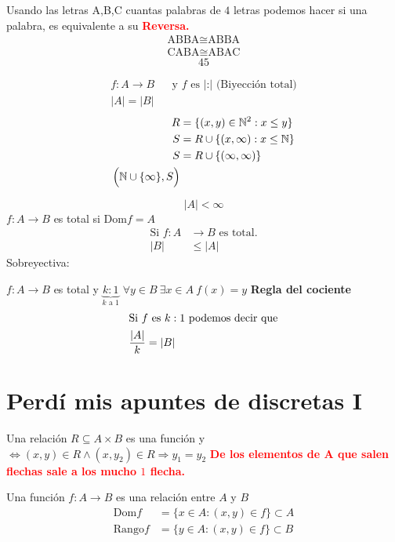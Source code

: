 \documentclass[12pt, twoside]{article}
\begin{document}
Usando las letras A,B,C cuantas palabras de $4$ letras podemos hacer si una palabra,
es equivalente a su \textcolor{red}{ \textbf{Reversa.}}
\begin{align*}
	\text{ABBA} \cong \text{ABBA}\\
	\text{CABA} \cong \text{ABAC}
\end{align*}
{\Huge\[45\]}

\teorema
{
	\Huge
	\begin{align*}
		f:A\longrightarrow B &&\text{y $f$ es |:| (Biyección total)}\\
		|A| = |B|
	\end{align*}
}
\begin{align*}
	R &= \{(x,y)\in\mathbb{N}^2:x\leq y\}\\
	S &= R \cup\{(x,\infty):x\leq\mathbb{N}\}\\
	S &= R \cup\{(\infty,\infty)\}\\
	\Big{(}
	\mathbb{N} \cup \{\infty\},S
	\Big{)}
\end{align*}

\[|A| < \infty\]
$f:A\longrightarrow B$ es total si Dom$f=A$
\begin{align*}
	\text{Si } f:A&\longrightarrow B \text{ es total.}\\
	|B| &\leq |A|
\end{align*}
Sobreyectiva:

$f:A\longrightarrow B$ es total y $\underbrace{k:1}_{\text{$k$ a $1$}}$
$\forall y \in B\ \exists x \in A\ f(x)=y$
\teorema
\textbf{Regla del cociente}
\begin{align*}
	\intertext{Si $f$ es $k:1$ podemos decir que}
	\frac{|A|}{k} &= |B|
\end{align*}

\section{Perdí mis apuntes de discretas I}%
\label{sec:Perdí mis apuntes de discretas I}

Una relación $R\subseteq A\times B$ es una función y
$\Longleftrightarrow(x,y)\in R \wedge (x,y_2)\in R \Longrightarrow y_1=y_2$
\textcolor{red}{ \textbf{De los elementos de $\mathbf{A}$ que salen flechas sale
a los mucho {\Huge $1$} flecha.}}

Una función $f:A\longrightarrow B$ es una relación entre $A$ y $B$
{\Huge
	\begin{align*}
		\text{Dom}f&=\{x\in A:(x,y)\in f\}\subset A\\
		\text{Rango}f&=\{y\in A:(x,y)\in f\}\subset B
	\end{align*}
}
\end{document}
